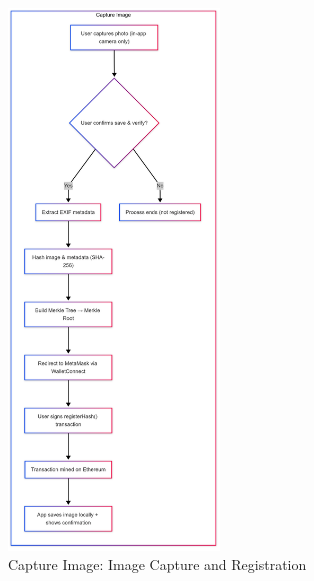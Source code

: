 \begin{figure}[htb]
    \centering
    \includegraphics[width=0.50\textwidth]{images/captureImageFlow.png}
    \caption{Capture Image: Image Capture and Registration}
    \label{fig:imageCaptureAndRegistration}
\end{figure}

